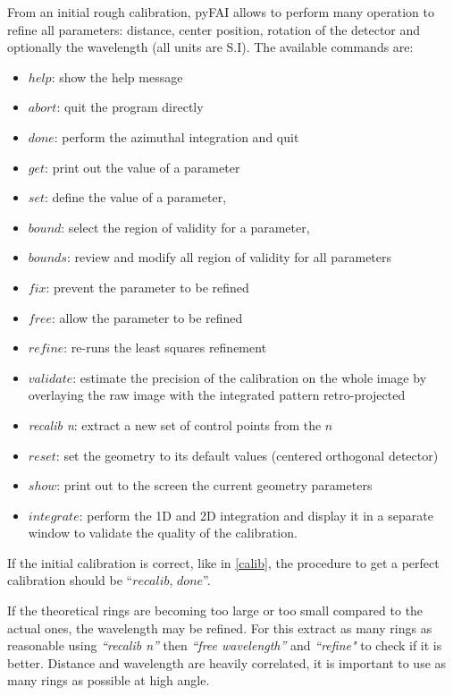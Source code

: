 \documentclass[preprint]{iucr}
\begin{document}
From an initial rough calibration, pyFAI allows to perform many operation to
refine all parameters: distance, center position, rotation of the detector and
optionally the wavelength (all units are S.I). 
The available commands are:
\begin{itemize}
\item $help$: show the help message
\item $abort$: quit the program directly
\item $done$: perform the azimuthal integration and quit
\item $get$: print out the value of a parameter 
\item $set$: define the value of a parameter,  
\item $bound$: select the region of validity for a parameter, 
\item $bounds$: review and modify all region of validity for all parameters
\item $fix$: prevent the parameter to be refined 
\item $free$: allow the parameter to be refined 
\item $refine$: re-runs the least squares refinement
\item $validate$: estimate the precision of the calibration on the whole
image by overlaying the raw image with the integrated pattern retro-projected
\item \textit{recalib n}: extract a new set of control points from the $n$
\item $reset$: set the geometry to its default values (centered orthogonal detector)
\item $show$: print out to the screen the current geometry parameters
\item $integrate$: perform the 1D and 2D integration and display it in a
separate window to validate the quality of the calibration.
\end{itemize}

If the initial calibration is correct, like in \ref{calib}, the procedure
to get a perfect calibration should be ``$recalib$, $done$''.

If the theoretical rings are becoming too large or too small compared to the
actual ones, the wavelength may be refined. For this extract as many rings as
reasonable using \textit{``recalib n''} then \textit{``free wavelength''} and
\textit{``refine"} to check if it is better. 
Distance and wavelength are
heavily correlated, it is important to use as many rings as possible at high angle.
\end{document}
